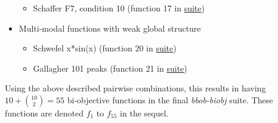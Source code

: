 \documentclass[letterpaper,12pt,english]{article}
\begin{document}
\begin{itemize}
\begin{itemize}
\item {} 
Schaffer F7, condition 10 (function 17 in \href{https://hal.inria.fr/inria-00362633}{ suite})

\end{itemize}

\item {} 
Multi-modal functions with weak global structure
\begin{itemize}
\item {} 
Schwefel x*sin(x) (function 20 in \href{https://hal.inria.fr/inria-00362633}{ suite})

\item {} 
Gallagher 101 peaks (function 21 in \href{https://hal.inria.fr/inria-00362633}{ suite})

\end{itemize}

\end{itemize}

Using the above described pairwise combinations, this results in
having \(10+{10 \choose 2} = 55\) bi-objective functions in
the final \emph{bbob-biobj} suite. These functions are denoted \(f_1\) to \(f_{55}\) in the sequel.
\end{document}
